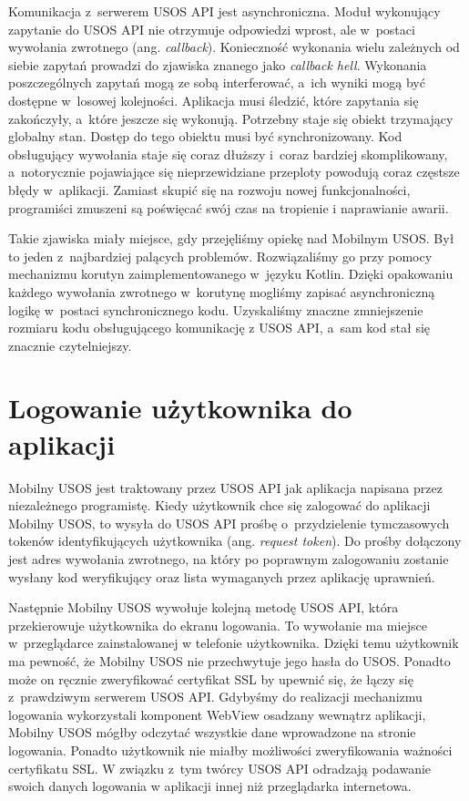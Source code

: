 \documentclass{pracamgr}
\begin{document}
Komunikacja z~serwerem USOS API jest asynchroniczna. Moduł wykonujący zapytanie
do USOS API nie otrzymuje odpowiedzi wprost, ale w~postaci wywołania zwrotnego
(ang. \textit{callback}). Konieczność wykonania wielu zależnych od siebie zapytań
prowadzi do zjawiska znanego jako \textit{callback hell}. Wykonania poszczególnych
zapytań mogą ze sobą interferować, a~ich wyniki mogą być dostępne w~losowej kolejności.
Aplikacja musi śledzić, które zapytania się zakończyły, a~które jeszcze się wykonują.
Potrzebny staje się obiekt trzymający globalny stan. Dostęp do tego obiektu musi
być synchronizowany. Kod obsługujący wywołania staje się coraz dłuższy i~coraz
bardziej skomplikowany, a~notorycznie pojawiające się nieprzewidziane przeploty
powodują coraz częstsze błędy w~aplikacji. Zamiast skupić się na rozwoju nowej
funkcjonalności, programiści zmuszeni są poświęcać swój czas na tropienie i
naprawianie awarii.

Takie zjawiska miały miejsce, gdy przejęliśmy opiekę nad Mobilnym USOS. Był to
jeden z~najbardziej palących problemów. Rozwiązaliśmy go przy pomocy mechanizmu
korutyn zaimplementowanego w~języku Kotlin. Dzięki opakowaniu każdego wywołania
zwrotnego w~korutynę mogliśmy zapisać asynchroniczną logikę w~postaci synchronicznego
kodu. Uzyskaliśmy znaczne zmniejszenie rozmiaru kodu obsługującego komunikację z
USOS API, a~sam kod stał się znacznie czytelniejszy.

\section{Logowanie użytkownika do aplikacji}

Mobilny USOS jest traktowany przez USOS API jak aplikacja napisana przez niezależnego
programistę. Kiedy użytkownik chce się zalogować do aplikacji Mobilny USOS, to wysyła
do USOS API prośbę o~przydzielenie tymczasowych tokenów identyfikujących użytkownika
(ang. \textit{request token}). Do prośby dołączony jest adres wywołania zwrotnego,
na który po poprawnym zalogowaniu zostanie wysłany kod weryfikujący oraz lista
wymaganych przez aplikację uprawnień.

Następnie Mobilny USOS wywołuje kolejną metodę USOS API, która przekierowuje
użytkownika do ekranu logowania. To wywołanie ma miejsce w~przeglądarce zainstalowanej
w telefonie użytkownika. Dzięki temu użytkownik ma pewność, że Mobilny USOS nie
przechwytuje jego hasła do USOS. Ponadto może on ręcznie zweryfikować certyfikat SSL
by upewnić się, że łączy się z~prawdziwym serwerem USOS API. Gdybyśmy do realizacji
mechanizmu logowania wykorzystali komponent WebView osadzany wewnątrz aplikacji,
Mobilny USOS mógłby odczytać wszystkie dane wprowadzone na stronie logowania.
Ponadto użytkownik nie miałby możliwości zweryfikowania ważności certyfikatu SSL.
W związku z~tym twórcy USOS API odradzają podawanie swoich danych logowania w
aplikacji innej niż przeglądarka internetowa.
\end{document}
